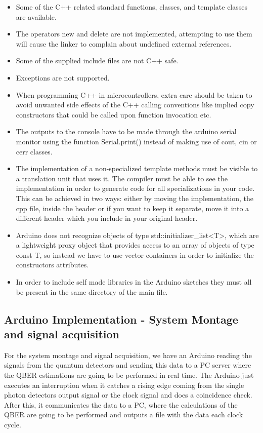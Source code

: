 \begin{refsection}
	\begin{itemize}
		\item Some of the C++ related standard functions, classes, and template classes are available.
		\item The operators new and delete are not implemented, attempting to use them will cause the linker to complain about undefined external references.
		\item Some of the supplied include files are not C++ safe.
		\item Exceptions are not supported.
		\item When programming C++ in microcontrollers, extra care should be taken to avoid unwanted side effects of the C++ calling conventions like implied copy constructors that could be called upon function invocation etc.
		\item The outputs to the console have to be made through the arduino serial monitor using the function Serial.print() instead of making use of cout, cin or cerr classes.
		\item  The implementation of a non-specialized template methods must be visible to a translation unit that uses it. The compiler must be able to see the implementation in order to generate code for all specializations in your code. This can be achieved in two ways: either by moving the implementation, the cpp file, inside the header or if you want to keep it separate, move it into a different header which you include in your original header.
		\item Arduino does not recognize objects of type std::initializer\_list<T>, which are a lightweight proxy object that provides access to an array of objects of type const T, so instead we have to use vector containers in order to initialize the constructors attributes.
		\item In order to include self made libraries in the Arduino sketches they must all be present in the same directory of the main file.
		
	\end{itemize}
	
	\clearpage
	
	\subsection{Arduino Implementation - System Montage and signal acquisition}
	
	For the system montage and signal acquisition, we have an Arduino reading the signals from the quantum detectors and sending this data to a PC server where the QBER estimations are going to be performed in real time. The Arduino just executes an interruption when it catches a rising edge coming from the single photon detectors output signal or the clock signal and does a coincidence check. After this, it communicates the data to a PC, where the calculations of the QBER are going to be performed and outputs a file with the data each clock cycle. 
	

\end{refsection}
